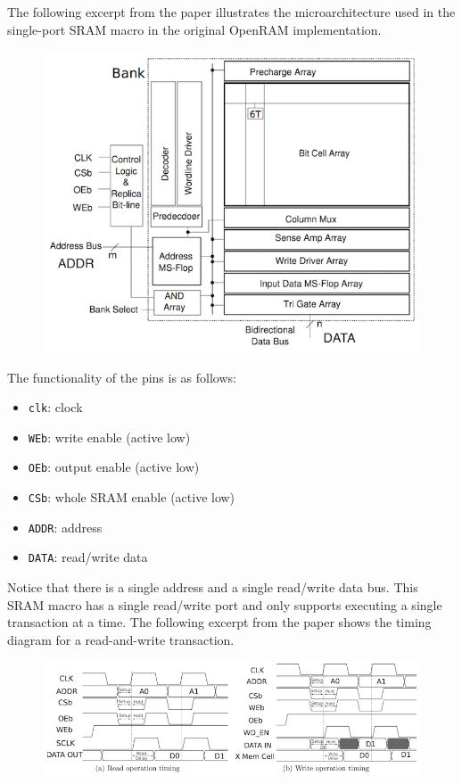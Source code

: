 \documentclass[a4paper,12pt,twoside]{article}
\begin{document}
The following excerpt from the paper illustrates the microarchitecture used in the single-port SRAM macro in the original OpenRAM implementation.
\begin{figure}[H]
    \centering
    \includegraphics[width=\textwidth]{images/13.png}
\end{figure}
The functionality of the pins is as follows:
\begin{itemize}
    \item \texttt{clk}: clock
    \item \texttt{WEb}: write enable (active low)
    \item \texttt{OEb}: output enable (active low)
    \item \texttt{CSb}: whole SRAM enable (active low)
    \item \texttt{ADDR}: address
    \item \texttt{DATA}: read/write data
\end{itemize}
Notice that there is a single address and a single read/write data bus. This SRAM macro has a single read/write port and only supports executing a single transaction at a time. The following excerpt from the paper shows the timing diagram for a read-and-write transaction.
\begin{figure}[H]
    \centering
    \includegraphics[width=\textwidth]{images/14.png}
\end{figure}
\end{document}
